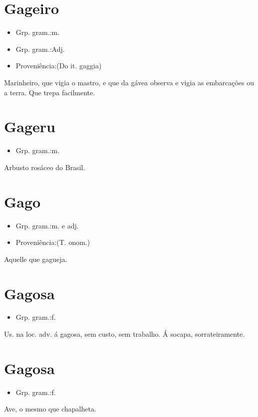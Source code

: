 \section{Gageiro}
\begin{itemize}
\item {Grp. gram.:m.}
\end{itemize}
\begin{itemize}
\item {Grp. gram.:Adj.}
\end{itemize}
\begin{itemize}
\item {Proveniência:(Do it. \textunderscore gaggia\textunderscore )}
\end{itemize}
Marinheiro, que vigia o mastro, e que da gávea observa e vigia as embarcações ou a terra.
Que trepa facilmente.
\section{Gageru}
\begin{itemize}
\item {Grp. gram.:m.}
\end{itemize}
Arbusto rosáceo do Brasil.
\section{Gago}
\begin{itemize}
\item {Grp. gram.:m.  e  adj.}
\end{itemize}
\begin{itemize}
\item {Proveniência:(T. onom.)}
\end{itemize}
Aquelle que gagueja.
\section{Gagosa}
\begin{itemize}
\item {Grp. gram.:f.}
\end{itemize}
Us. na loc. adv. \textunderscore á gagosa\textunderscore , sem custo, sem trabalho.
Á socapa, sorrateiramente.
\section{Gagosa}
\begin{itemize}
\item {Grp. gram.:f.}
\end{itemize}
Ave, o mesmo que \textunderscore chapalheta\textunderscore .

